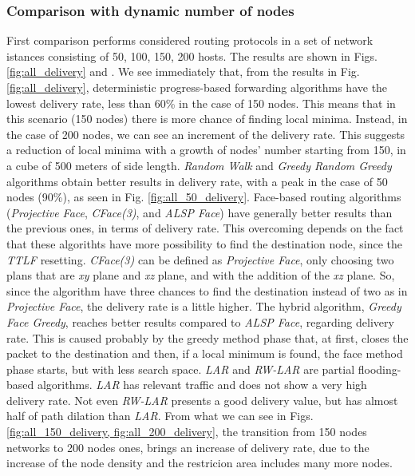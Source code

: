 \documentclass[journal,comsoc]{IEEEtran}
\begin{document}
\subsubsection{Comparison with dynamic number of nodes}
First comparison performs considered routing protocols in a set of network istances consisting of 50, 100, 150, 200 hosts. The results are shown in Figs. \ref{fig:all_delivery} and . We see immediately that, from the results in Fig. \ref{fig:all_delivery}, deterministic progress-based forwarding algorithms have the lowest delivery rate, less than 60\% in the case of 150 nodes. This means that in this scenario (150 nodes) there is more chance of finding local minima. Instead, in the case of 200 nodes, we can see an increment of the delivery rate. This suggests a reduction of local minima with a growth of nodes' number starting from 150, in a cube of 500 meters of side length. \emph{Random Walk} and \emph{Greedy Random Greedy} algorithms obtain better results in delivery rate, with a peak in the case of 50 nodes (90\%), as seen in Fig. \ref{fig:all_50_delivery}. Face-based routing algorithms (\emph{Projective Face}, \emph{CFace(3)}, and \emph{ALSP Face}) have generally better results than the previous ones, in terms of delivery rate. This overcoming depends on the fact that these algorithts have more possibility to find the destination node, since the \emph{TTLF} resetting. \emph{CFace(3)} can be defined as \emph{Projective Face}, only choosing two plans that are \emph{xy} plane and \emph{xz} plane, and with the addition of the \emph{xz} plane. So, since the algorithm have three chances to find the
destination instead of two as in \emph{Projective Face}, the delivery rate is a little higher. The hybrid algorithm, \emph{Greedy Face Greedy}, reaches better results compared to \emph{ALSP Face}, regarding delivery rate. This is caused probably by the greedy method phase that, at first, closes the packet to the destination and then, if a local minimum is found, the face method phase starts, but with less search space. \emph{LAR} and \emph{RW-LAR} are partial flooding-based algorithms. \emph{LAR} has relevant traffic and does not show a very high delivery rate. Not even \emph{RW-LAR} presents a good delivery value, but has almost half of path dilation than \emph{LAR}. From what we can see in Figs. \ref{fig:all_150_delivery, fig:all_200_delivery}, the transition from 150 nodes networks to 200 nodes ones, brings an increase of delivery rate, due to the increase of the node density and the restricion area includes many more nodes.
\end{document}
